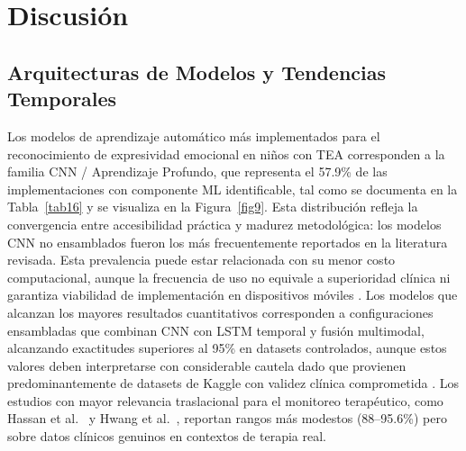 \documentclass[ASNA,twocolumn]{USG}
\begin{document}
	\section{Discusión}\label{sec6}
	
	\subsection{Arquitecturas de Modelos y Tendencias Temporales}\label{sec6a}
	
	Los modelos de aprendizaje automático más implementados para el reconocimiento de
	expresividad emocional en niños con TEA corresponden a la familia CNN / Aprendizaje
	Profundo, que representa el 57.9\% de las implementaciones con componente ML
	identificable, tal como se documenta en la Tabla~\ref{tab16} y se visualiza en la
	Figura~\ref{fig9}. Esta distribución refleja la convergencia entre accesibilidad
	práctica y madurez metodológica: los modelos CNN no ensamblados fueron los más
	frecuentemente reportados en la literatura revisada. Esta prevalencia puede estar
	relacionada con su menor costo computacional, aunque la frecuencia de uso no
	equivale a superioridad clínica ni garantiza viabilidad de implementación en
	dispositivos móviles \cite{Sholikah2024}. Los modelos que alcanzan los mayores
	resultados cuantitativos corresponden a configuraciones ensambladas que combinan
	CNN con LSTM temporal y fusión multimodal, alcanzando exactitudes superiores al
	95\% en datasets controlados, aunque estos valores deben interpretarse con
	considerable cautela dado que provienen predominantemente de datasets de Kaggle con
	validez clínica comprometida \cite{Aljbori2025,Ramachandran2025}. Los estudios con
	mayor relevancia traslacional para el monitoreo terapéutico, como Hassan et al.\
	\cite{Hassan2025} y Hwang et al.\ \cite{Hwang2024}, reportan rangos más modestos
	(88--95.6\%) pero sobre datos clínicos genuinos en contextos de terapia real.
	
\end{document}
